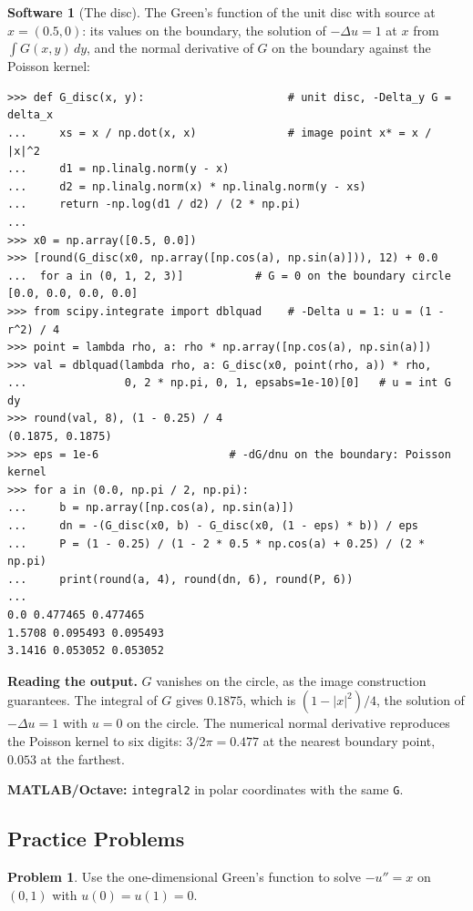 \documentclass[11pt,a4paper]{article}
\numberwithin{equation}{section}
\theoremstyle{definition}
\newtheorem{software}[thm]{Software}
\newtheorem{problemx}{Problem}[subsection]
\newenvironment{problem}{\begin{problemx}}{\end{problemx}}
\begin{document}
\begin{software}[The disc]
\label{sw:greendisc}
The Green's function of the unit disc with source at $x = (0.5, 0)$: its values on the boundary, the solution of $-\Delta u = 1$ at $x$ from $\int G(x, y)\,dy$, and the normal derivative of $G$ on the boundary against the Poisson kernel:
{\small\begin{verbatim}
>>> def G_disc(x, y):                      # unit disc, -Delta_y G = delta_x
...     xs = x / np.dot(x, x)              # image point x* = x / |x|^2
...     d1 = np.linalg.norm(y - x)
...     d2 = np.linalg.norm(x) * np.linalg.norm(y - xs)
...     return -np.log(d1 / d2) / (2 * np.pi)
...
>>> x0 = np.array([0.5, 0.0])
>>> [round(G_disc(x0, np.array([np.cos(a), np.sin(a)])), 12) + 0.0
...  for a in (0, 1, 2, 3)]           # G = 0 on the boundary circle
[0.0, 0.0, 0.0, 0.0]
>>> from scipy.integrate import dblquad    # -Delta u = 1: u = (1 - r^2) / 4
>>> point = lambda rho, a: rho * np.array([np.cos(a), np.sin(a)])
>>> val = dblquad(lambda rho, a: G_disc(x0, point(rho, a)) * rho,
...               0, 2 * np.pi, 0, 1, epsabs=1e-10)[0]   # u = int G dy
>>> round(val, 8), (1 - 0.25) / 4
(0.1875, 0.1875)
>>> eps = 1e-6                    # -dG/dnu on the boundary: Poisson kernel
>>> for a in (0.0, np.pi / 2, np.pi):
...     b = np.array([np.cos(a), np.sin(a)])
...     dn = -(G_disc(x0, b) - G_disc(x0, (1 - eps) * b)) / eps
...     P = (1 - 0.25) / (1 - 2 * 0.5 * np.cos(a) + 0.25) / (2 * np.pi)
...     print(round(a, 4), round(dn, 6), round(P, 6))
...
0.0 0.477465 0.477465
1.5708 0.095493 0.095493
3.1416 0.053052 0.053052
\end{verbatim}}
\textbf{Reading the output.} $G$ vanishes on the circle, as the image construction guarantees. The integral of $G$ gives $0.1875$, which is $(1 - |x|^2)/4$, the solution of $-\Delta u = 1$ with $u = 0$ on the circle. The numerical normal derivative reproduces the Poisson kernel to six digits: $3/2\pi = 0.477$ at the
nearest boundary point, $0.053$ at the farthest.

\textbf{MATLAB/Octave:} \texttt{integral2} in polar coordinates with the same \texttt{G}.
\end{software}

\subsection{Practice Problems}

\begin{problem}
Use the one-dimensional Green's function to solve $-u'' = x$ on $(0, 1)$ with $u(0) = u(1) = 0$.
\end{problem}
\end{document}
